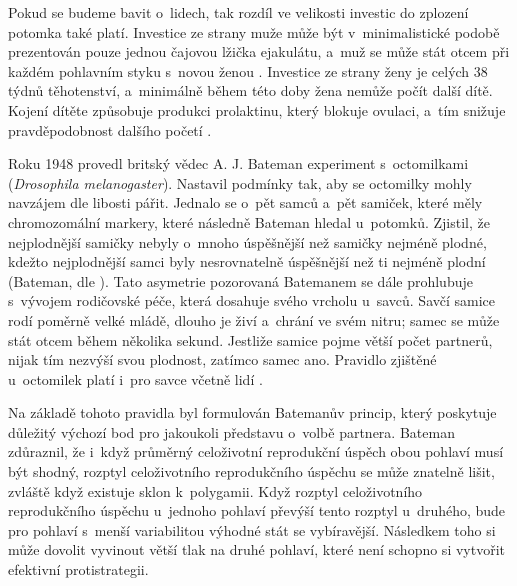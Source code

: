 \documentclass[a4paper, 12pt, notitlepage, oneside, numbers=noenddot]{report}
\begin{document}
Pokud se budeme bavit o~lidech, tak rozdíl ve velikosti investic do
zplození potomka také platí.  Investice ze strany muže může být
v~minimalistické podobě prezentován pouze jednou čajovou lžička
ejakulátu, a~muž se může stát otcem při každém pohlavním styku s~novou
ženou \citep{Buss2007}.  Investice ze strany ženy je celých 38 týdnů
těhotenství, a~minimálně během této doby žena nemůže počít další dítě.
Kojení dítěte způsobuje produkci prolaktinu, který blokuje ovulaci,
a~tím snižuje pravděpodobnost dalšího početí \citep{Kovar2005}.

Roku 1948 provedl britský vědec A. J. Bateman experiment s~octomilkami
(\textit{Drosophila melanogaster}).  Nastavil podmínky tak, aby se
octomilky mohly navzájem dle libosti pářit.  Jednalo se o~pět samců
a~pět samiček, které měly chromozomální markery, které následně
Bateman hledal u~potomků.  Zjistil, že nejplodnější samičky nebyly
o~mnoho úspěšnější než samičky nejméně plodné, kdežto nejplodnější
samci byly nesrovnatelně úspěšnější než ti nejméně plodní (Bateman,
dle \citealp{Ridley2007,Trivers1972}).  Tato asymetrie pozorovaná
Batemanem se dále prohlubuje s~vývojem rodičovské péče, která dosahuje
svého vrcholu u~savců.  Savčí samice rodí poměrně velké mládě, dlouho
je živí a~chrání ve svém nitru; samec se může stát otcem během
několika sekund.  Jestliže samice pojme větší počet partnerů, nijak
tím nezvýší svou plodnost, zatímco samec ano.  Pravidlo zjištěné
u~octomilek platí i~pro savce včetně lidí \citet{Ridley2007,Buss2007}.

Na základě tohoto pravidla byl formulován Batemanův princip, který
poskytuje dů\-le\-ži\-tý výchozí bod pro jakoukoli představu o~volbě
partnera.  Bateman \citep{BarrettDunbarLycett2007} zdůraznil, že
i~když průměrný celoživotní reprodukční úspěch obou pohlaví musí být
shodný, rozptyl celoživotního reprodukčního úspěchu se může znatelně
lišit, zvláště když existuje sklon k~polygamii.  Když rozptyl
celoživotního reprodukčního úspěchu u~jednoho pohlaví převýší tento
rozptyl u~druhého, bude pro pohlaví s~menší variabilitou výhodné stát
se vybíravější.  Následkem toho si může dovolit vyvinout větší tlak na
druhé pohlaví, které není schopno si vytvořit efektivní
protistrategii.
\end{document}
